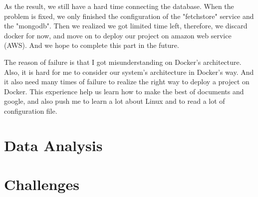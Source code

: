 \documentclass{article}
\begin{document}
As the result, we still have a hard time connecting the database. When the problem is fixed, we only finished the configuration of the "fetchstore" service and the "mongodb". Then we realized we got limited time left, therefore, we discard docker for now, and move on to deploy our project on amazon web service (AWS). And we hope to complete this part in the future.

The reason of failure is that I got misunderstanding on Docker's architecture. Also, it is hard for me to consider our system's architecture in Docker's way. And it also need many times of failure to realize the right way to deploy a project on Docker. This experience help us learn how to make the best of documents and google, and also push me to learn a lot about Linux and to read a lot of configuration file.

\section{Data Analysis}

\section{Challenges}



\printglossary

\end{document}
